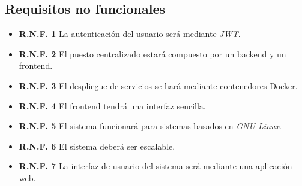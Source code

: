 \subsection{Requisitos no funcionales}
\begin{itemize}
	\item \textbf{R.N.F. 1} La autenticación del usuario será mediante \textit{JWT}.
	\item \textbf{R.N.F. 2} El puesto centralizado estará compuesto por un backend y un frontend.
	\item \textbf{R.N.F. 3} El despliegue de servicios se hará mediante contenedores Docker.
	\item \textbf{R.N.F. 4} El frontend tendrá una interfaz sencilla.
	\item \textbf{R.N.F. 5} El sistema funcionará para sistemas basados en \textit{GNU Linux}.
	\item \textbf{R.N.F. 6} El sistema deberá ser escalable.
	\item \textbf{R.N.F. 7} La interfaz de usuario del sistema será mediante una aplicación web.
\end{itemize}


